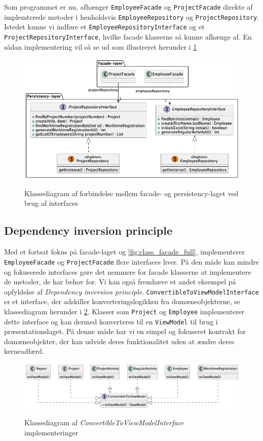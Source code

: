 Som programmet er nu, afhænger \texttt{EmployeeFacade} og \texttt{ProjectFacade} direkte af implemterede metoder i henholdsvis \texttt{EmployeeRepository} og \texttt{ProjectRepository}. Istedet kunne vi indføre et \texttt{EmployeeRepositoryInterface} og et \texttt{ProjectRepositoryInterface}, hvilke facade klasserne så kunne afhænge af. En sådan implementering vil så se ud som illustreret herunder i \cref{fig:class_facade_persistency_improved}
\begin{figure}[H]
  \centering
  \caption{Klassediagram af forbindelse mellem facade- og persistency-laget ved brug af interfaces}
  \includegraphics[width = 12cm, keepaspectratio]{TaskFusion/out/assets/diagrams/class_persistency_to_facade_improved/persistency_to_facade_example.png}
  \label{fig:class_facade_persistency_improved}
\end{figure}
\subsection{Dependency inversion principle} \label{sec:solid_d}
Med et fortsat fokus på facade-laget og \cref{fig:class_facade_full}, implementerer \texttt{EmployeeFacade} og \texttt{ProjectFacade} flere interfaces hver. På den måde kan mindre og fokuserede interfaces gøre det nemmere for facade klasserne at implementere de metoder, de har behov for.\newline
Vi kan også fremhæve et andet eksempel på opfyldelse af \textit{Dependency inversion principle}. \texttt{ConvertibleToViewModelInterface} er et interface, der adskiller konverteringslogikken fra domæneobjekterne, se klassediagram herunder i \cref{fig:class_convertible_example}. Klasser som \texttt{Project} og \texttt{Employee} implementerer dette interface og kan dermed konverteres til en \texttt{ViewModel} til brug i præsentationslaget. På denne måde har vi en simpel og fokuseret kontrakt for domæneobjekter, der kan udvide deres funktionalitet uden at ændre deres kerneadfærd.
\begin{figure}[H]
  \centering
  \caption{Klassediagram af \textit{ConvertibleToViewModelInterface} implementeringer}
  \includegraphics[width = \textwidth, keepaspectratio]{TaskFusion/out/assets/diagrams/class_convertibleToViewModel_example/ConvertibleToViewModel_diagram.png}
  \label{fig:class_convertible_example}
\end{figure}